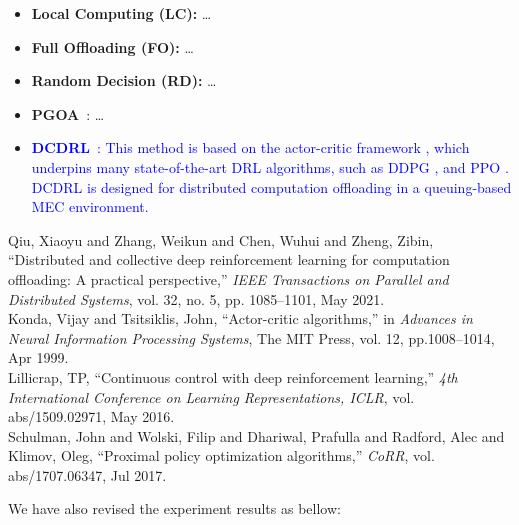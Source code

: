 \documentclass[12pt,draftclsnofoot,onecolumn]{IEEEtran}
\newcommand{\rev}[1]{{\color{blue}#1}} %
\newcommand{\rev}[1]{#1}
\newenvironment{my}[2]%
{\begin{list}{}%
{\setlength{\rightmargin}{#1}\setlength{\leftmargin}{#2}}%


 \item[]{}

} {\end{list}}
\begin{document}
\begin{enumerate}
\begin{my}{1cm}{1cm}
{{\begin{itemize}
				\item \textbf{Local Computing (LC):} \dots\vspace{1mm}
				
				\item \textbf{Full Offloading (FO):} \dots\vspace{1mm}
				
				\item \textbf{Random Decision (RD):} \dots\vspace{1mm}
				
				\item \textbf{PGOA}~\cite{yang2018distributed}: \dots\vspace{1mm}
				
				\color{blue}
			\item \textcolor{blue}{\textbf{DCDRL}~\cite{qiu2020distributed}: This method is based on the actor-critic framework \cite{NIPS1999_6449f44a}, which underpins many state-of-the-art DRL algorithms, such as DDPG \cite{lillicrap2015continuous}, and PPO \cite{schulman2017proximal}. DCDRL is designed for distributed computation offloading in a queuing-based MEC environment.} 
				
				
			\end{itemize}
			
	}}
\end{my}\vspace{5mm}

\begin{my}{1cm}{1cm}
	\rev{
		{\small
			\noindent\hspace{-0.5mm}\cite{qiu2020distributed} Qiu, Xiaoyu and Zhang, Weikun and Chen, Wuhui and Zheng, Zibin, ``Distributed and collective deep reinforcement learning for computation offloading: A practical perspective,'' \textit{IEEE Transactions on Parallel and Distributed Systems}, vol. 32, no. 5, pp. 1085--1101, May 2021.\\[10pt]
			\cite{NIPS1999_6449f44a} Konda, Vijay and Tsitsiklis, John, ``Actor-critic algorithms,'' in \textit{Advances in Neural Information Processing Systems}, The {MIT} Press, vol. 12, pp.1008--1014, Apr 1999.\\[10pt]
			\cite{lillicrap2015continuous} Lillicrap, TP, ``Continuous control with deep reinforcement learning,'' \textit{4th International Conference on Learning Representations, {ICLR}}, vol. abs/1509.02971, May 2016.\\[10pt]
			\cite{schulman2017proximal} Schulman, John and Wolski, Filip and Dhariwal, Prafulla and Radford, Alec and Klimov, Oleg, ``Proximal policy optimization algorithms,'' \textit{CoRR}, vol. abs/1707.06347, Jul 2017.}\\}
\end{my}
We have also revised the experiment results as bellow: 


\end{enumerate}
\end{document}
